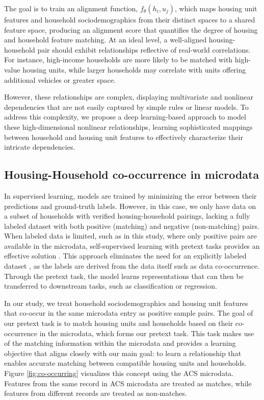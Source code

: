 \documentclass[]{nature_mod}
\begin{document}
The goal is to train an alignment function, $f_\theta(h_i, u_j)$, which maps housing unit features and household sociodemographics from their distinct spaces to a shared feature space, producing an alignment score that quantifies the degree of housing and household feature matching. At an ideal level, a well-aligned housing-household pair should exhibit relationships reflective of real-world correlations. For instance, high-income households are more likely to be matched with high-value housing units, while larger households may correlate with units offering additional vehicles or greater space.

However, these relationships are complex, displaying multivariate and nonlinear dependencies that are not easily captured by simple rules or linear models. To address this complexity, we propose a deep learning-based approach to model these high-dimensional nonlinear relationships, learning sophisticated mappings between household and housing unit features to effectively characterize their intricate dependencies. 

\subsection{Housing-Household co-occurrence in microdata}
In supervised learning, models are trained by minimizing the error between their predictions and ground-truth labels. However, in this case, we only have data on a subset of households with verified housing-household pairings, lacking a fully labeled dataset with both positive (matching) and negative (non-matching) pairs. When labeled data is limited, such as in this study, where only positive pairs are available in the microdata, self-supervised learning with pretext tasks provides an effective solution \cite{jing2020self}. This approach eliminates the need for an explicitly labeled dataset \cite{liu2021self}, as the labels are derived from the data itself such as data co-occurrence. Through the pretext task, the model learns representations that can then be transferred to downstream tasks, such as classification or regression.

In our study, we treat household sociodemographics and housing unit features that co-occur in the same microdata entry as positive sample pairs. The goal of our pretext task is to match housing units and households based on their co-occurrence in the microdata, which forms our pretext task. This task makes use of the matching information within the microdata and provides a learning objective that aligns closely with our main goal: to learn a relationship that enables accurate matching between compatible housing units and households. Figure \ref{fig:co-occurring} visualizes this concept using the ACS microdata. Features from the same record in ACS microdata are treated as matches, while features from different records are treated as non-matches.
\end{document}
